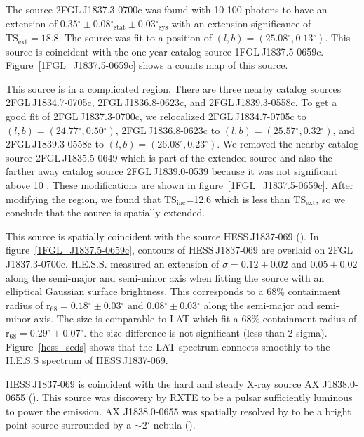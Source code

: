 \documentclass[12pt,preprint]{aastex}
\newcommand{\gev}{\text{GeV}\xspace}
\newcommand{\tev}{\text{TeV}\xspace}
\newcommand{\tsext}{{\ensuremath{\text{TS}_{\text{ext}}}}\xspace}
\newcommand{\tsinc}{\ensuremath{\text{TS}_{\text{inc}}}\xspace}
\newcommand{\chandra}{\text{{\em Chandra}}\xspace}
\newcommand{\rsixeight}{{\ensuremath{\text{r}_{68}}}\xspace}
\newcommand{\sys}{\text{sys}\xspace}
\newcommand{\stat}{\text{stat}\xspace}
\renewcommand{\deg}{\ensuremath{^\circ}\xspace}
\begin{document}

The source 2FGL\,J1837.3-0700c was found with 10-100 \gev photons to
have an extension of $0.35\deg\pm0.08\deg_\stat\pm0.03\deg_\sys$ with an
extension significance of $\tsext=18.8$.  The source was fit to a position
of $(l,b)=(25.08\deg,0.13\deg)$.  This source is coincident with the one
year catalog source 1FGL\,J1837.5-0659c.  Figure~\ref{1FGL_J1837.5-0659c}
shows a counts map of this source.

This source is in a complicated region. There are three nearby
catalog sources 2FGL\,J1834.7-0705c, 2FGL\,J1836.8-0623c, and
2FGL\,J1839.3-0558c.  To get a good fit of 2FGL\,J1837.3-0700c, we
relocalized 2FGL\,J1834.7-0705c to $(l,b)=(24.77\deg,0.50\deg)$,
2FGL\,J1836.8-0623c to $(l,b)=(25.57\deg,0.32\deg)$, and
2FGL\,J1839.3-0558c to $(l,b)=(26.08\deg,0.23\deg)$.  We removed the
nearby catalog source 2FGL\,J1835.5-0649 which is part of the extended
source and also the farther away catalog source 2FGL\,J1839.0-0539
because it was not significant above 10 \gev. These modifications are
shown in figure~\ref{1FGL_J1837.5-0659c}.  After modifying the region,
we found that \tsinc=12.6 which is less than \tsext, so we conclude that
the source is spatially extended.

This source is spatially coincident with the \tev source HESS\,J1837-069
(\cite{hess_plane_survey}).  In figure~\ref{1FGL_J1837.5-0659c}, contours
of HESS\,J1837-069 are overlaid on 2FGL\,J1837.3-0700c. H.E.S.S. measured
an extension of $\sigma=0.12\pm0.02$ and $0.05\pm0.02$
along the semi-major and semi-minor axis when fitting the source
with an elliptical Gaussian surface brightness.  This corresponds
to a 68\% containment radius of $\rsixeight=0.18\deg\pm0.03\deg$ and
$0.08\deg\pm0.03\deg$ along the semi-major and semi-minor axis. The
size is comparable to LAT which fit a 68\% containment radius of
$\rsixeight=0.29\deg\pm0.07\deg$.  the size difference is not significant
(less than 2 sigma).  Figure~\ref{hess_seds} shows that the LAT spectrum
connects smoothly to the H.E.S.S spectrum of HESS\,J1837-069.

HESS\,J1837-069 is coincident with the hard
and steady X-ray source AX J1838.0-0655
(\cite{einstein_galactic_plane_survey,hard_x-ray_asca,integral_AX_J1838.0-0655,swift_follow_up,pulsations_HESS_J1837-069,suzaku_HESS_J1837-069}).
This source was discovery by RXTE to 
be a pulsar 
sufficiently luminous to power the \tev emission.
AX J1838.0-0655 was spatially resolved by \chandra to be a bright point source
surrounded by a $\sim2'$ nebula (\cite{pulsations_HESS_J1837-069}).
\end{document}
